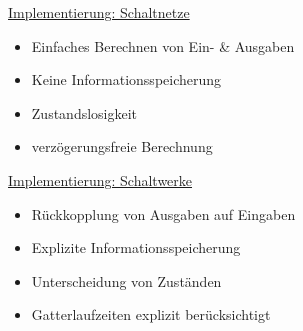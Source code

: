 \documentclass[12pt]{report}
\begin{document}
\begin{figure}[H]
  \begin{minipage}[t]{0.48\textwidth}
    \centering
    \underline{Implementierung: Schaltnetze}
    
    \begin{itemize}
      \item Einfaches Berechnen von Ein- \& Ausgaben
      \item Keine Informationsspeicherung
      \item Zustandslosigkeit
      \item verzögerungsfreie Berechnung
    \end{itemize}
  \end{minipage}
  \hfill
  \begin{minipage}[t]{0.48\textwidth}
    \centering
    \underline{Implementierung: Schaltwerke}
    
    \begin{itemize}
      \item Rückkopplung von Ausgaben auf Eingaben
      \item Explizite Informationsspeicherung
      \item Unterscheidung von Zuständen
      \item Gatterlaufzeiten explizit berücksichtigt
    \end{itemize}
    
  \end{minipage}
\end{figure}
\end{document}
